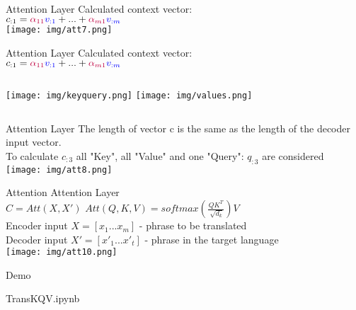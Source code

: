 \documentclass{beamer}
\begin{document}
\begin{frame}{Attention Layer}
Calculated context vector:\\
$c_{:1}=\color{purple}\alpha_{11} \color{blue}v_{:1} \color{black}+...+\color{purple}\alpha_{m1} \color{blue} v_{:m}$\\

\texttt{[image: img/att7.png]} 
\end{frame}

\begin{frame}{Attention Layer}
Calculated context vector:\\
$c_{:1}=\color{purple}\alpha_{11} \color{blue}v_{:1} \color{black}+...+\color{purple}\alpha_{m1} \color{blue} v_{:m}$\\
\begin{columns}
\texttt{[image: img/keyquery.png]} 
\texttt{[image: img/values.png]} 
\end{columns}
\end{frame}

\begin{frame}{Attention Layer}
The length of vector c is the same as the length of the decoder  input vector.\\
To calculate $c_{:3}$ all "Key", all "Value" and one "Query": $q_{:3}$ are considered\\
\texttt{[image: img/att8.png]} 
\end{frame}


\begin{frame}{Attention}
Attention Layer\\
\bigskip
$C=Att(X,X')$ \hspace{2cm} $Att(Q,K,V)=softmax(\frac{QK^T}{\sqrt[]{d_k}})V$\\
\bigskip
Encoder input $X=[x_1 ... x_m]$ - phrase to be translated\\
Decoder input $X'=[x'_1 ... x'_t]$ - phrase in the target language\\
\texttt{[image: img/att10.png]} 

\end{frame}

\begin{frame}{Demo}
\bigskip
\begin{center}
TransKQV.ipynb
\end{center}
\end{frame}
\end{document}
